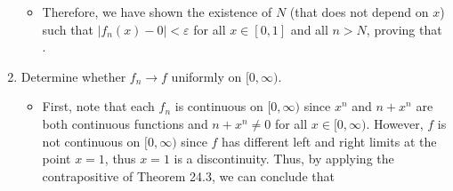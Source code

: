 \documentclass[10pt,a4paper]{article}
\theoremstyle{definition}
\begin{document}
\begin{enumerate}[label = (\alph*)]
\begin{itemize}
	\item Therefore, we have shown the existence of $N$ (that does not depend on $x$) such that $|f_n(x) - 0| < \varepsilon$ for all $x \in [0,1]$ and all $n > N$, proving that .
	\end{itemize}
\item Determine whether $f_n \to f$ uniformly on $[0, \infty)$.
	\begin{itemize}
	\item First, note that each $f_n$ is continuous on $[0,\infty)$ since $x^n$ and $n + x^n$ are both continuous functions and $n + x^n \neq 0$ for all $x \in [0, \infty)$. However, $f$ is not continuous on $[0, \infty)$ since $f$ has different left and right limits at the point $x = 1$, thus $x = 1$ is a discontinuity. Thus, by applying the contrapositive of Theorem 24.3, we can conclude that 
	\end{itemize}
\end{enumerate}
\end{document}
